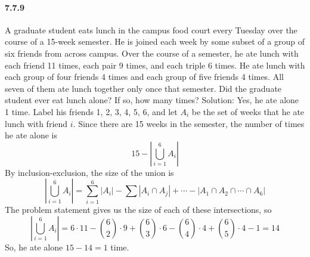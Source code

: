 \documentclass{article}
\begin{document}
\paragraph{7.7.9}
A graduate student eats lunch in the campus food court every Tuesday over the
course of a 15-week semester. He is joined each week by some subset of a group of
six friends from across campus. Over the course of a semester, he ate lunch with each
friend 11 times, each pair 9 times, and each triple 6 times. He ate lunch with each group of four friends 4 times and each group of five friends 4 times. All seven of them
ate lunch together only once that semester. Did the graduate student ever eat lunch
alone? If so, how many times?\newline
Solution:\newline
Yes, he ate alone 1 time. Label his friends 1, 2, 3, 4, 5, 6, and let $A_i$ be the set of weeks that
he ate lunch with friend $i$. Since there are 15 weeks in the semester, the number of times he
ate alone is $$15-|\bigcup_{i=1}^6 A_i|$$
By inclusion-exclusion, the size of the union is
$$|\bigcup_{i=1}^6 A_i|=\sum_{i=1}^6|A_i|-\sum|A_i\cap A_j|+ \cdots -|A_1\cap A_2 \cap \cdots \cap A_6|$$
The problem statement gives us the size of each of these intersections, so $$|\bigcup_{i=1}^6 A_i|=6\cdot 11-\binom{6}{2}\cdot 9 +\binom{6}{3}\cdot 6 - \binom{6}{4}\cdot 4 +\binom{6}{5}\cdot 4 -1=14$$
So, he ate alone $15 - 14 = 1$ time.
\end{document}
